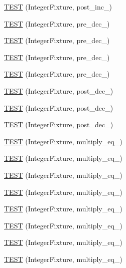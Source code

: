 \begin{DoxyCompactItemize}
\item 
\hyperlink{TestInteger_8c_09_09_a18123399522373c6e417a91125a91d2d}{T\-E\-S\-T} (Integer\-Fixture, post\-\_\-inc\-\_)
\item 
\hyperlink{TestInteger_8c_09_09_a7a71a2268849866ccfaf01ce27a45dcd}{T\-E\-S\-T} (Integer\-Fixture, pre\-\_\-dec\-\_)
\item 
\hyperlink{TestInteger_8c_09_09_ae2e5f795cb426e11f775d8f3e0b5e51f}{T\-E\-S\-T} (Integer\-Fixture, pre\-\_\-dec\-\_)
\item 
\hyperlink{TestInteger_8c_09_09_a77ca1f9c65877ab3183adfce1895bbf3}{T\-E\-S\-T} (Integer\-Fixture, pre\-\_\-dec\-\_)
\item 
\hyperlink{TestInteger_8c_09_09_a1774ee173e3896c82a9520195a621192}{T\-E\-S\-T} (Integer\-Fixture, pre\-\_\-dec\-\_)
\item 
\hyperlink{TestInteger_8c_09_09_a1d4894243b7b696916782c76a76c55b1}{T\-E\-S\-T} (Integer\-Fixture, post\-\_\-dec\-\_)
\item 
\hyperlink{TestInteger_8c_09_09_a8f1fd5d8e2ed01134f37a530ffc52691}{T\-E\-S\-T} (Integer\-Fixture, post\-\_\-dec\-\_)
\item 
\hyperlink{TestInteger_8c_09_09_a764bca130609040b4e524f964d86b2db}{T\-E\-S\-T} (Integer\-Fixture, post\-\_\-dec\-\_)
\item 
\hyperlink{TestInteger_8c_09_09_ad254190417cbd6d245454a16f626bbbd}{T\-E\-S\-T} (Integer\-Fixture, multiply\-\_\-eq\-\_)
\item 
\hyperlink{TestInteger_8c_09_09_a3f0fa2a297766b42c81e29319083ee06}{T\-E\-S\-T} (Integer\-Fixture, multiply\-\_\-eq\-\_)
\item 
\hyperlink{TestInteger_8c_09_09_a406d5e24880b95b0a3b5b5d1d2583847}{T\-E\-S\-T} (Integer\-Fixture, multiply\-\_\-eq\-\_)
\item 
\hyperlink{TestInteger_8c_09_09_a080b8f5ed886123f7bf2271774b74358}{T\-E\-S\-T} (Integer\-Fixture, multiply\-\_\-eq\-\_)
\item 
\hyperlink{TestInteger_8c_09_09_a415d0b02ca47297b52da0e42ef66a406}{T\-E\-S\-T} (Integer\-Fixture, multiply\-\_\-eq\-\_)
\item 
\hyperlink{TestInteger_8c_09_09_a32c9749699b06125f30657edbcc75e7a}{T\-E\-S\-T} (Integer\-Fixture, multiply\-\_\-eq\-\_)
\item 
\hyperlink{TestInteger_8c_09_09_a37e767335517132852737542f5004656}{T\-E\-S\-T} (Integer\-Fixture, multiply\-\_\-eq\-\_)
\item 
\hyperlink{TestInteger_8c_09_09_a07091c692ea9552db3678636492f72f4}{T\-E\-S\-T} (Integer\-Fixture, multiply\-\_\-eq\-\_)

\end{DoxyCompactItemize}
